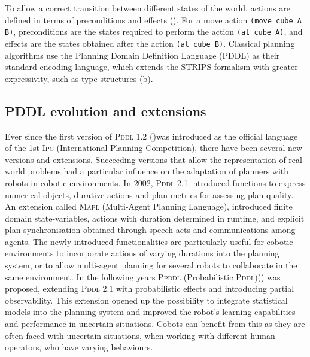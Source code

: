 To allow a correct transition between different states of the world, actions are defined in terms of {preconditions} and {effects} (). For a move action \texttt{(move cube A B)}, preconditions are the states required to perform the action  \texttt{(at cube A)}, and effects are the states obtained after the action \texttt{(at cube B)}. Classical planning algorithms use the Planning Domain Definition Language (PDDL) \cite{ghallab2004automated} as their standard encoding language, which extends the STRIPS \cite{fikes1971strips} formalism with greater expressivity, such as type structures (b). 




\subsection{PDDL evolution and extensions}\label{subsec:PDDL evolution}

Ever since the first version of \textsc{Pddl} 1.2 (\cite{mcdermott1998pddl})was introduced as the official language of the 1st \textsc{Ipc} (International Planning Competition), there have been several new versions and extensions. 
Succeeding versions that allow the representation of real-world problems had a particular influence on the adaptation of planners with robots in cobotic environments. In 2002, \textsc{Pddl} 2.1 introduced functions to express numerical objects, durative actions and plan-metrics for assessing plan quality. 
An extension called \textsc{Mapl} (Multi-Agent Planning Language), introduced finite domain state-variables, actions with duration determined in runtime, and explicit plan synchronisation obtained through speech acts and communications among agents. 
The newly introduced functionalities are particularly useful for cobotic environments to incorporate actions of varying durations into the planning system, or to allow multi-agent planning for several robots to collaborate in the same environment.
In the following years \textsc{Ppddl} (Probabilistic \textsc{Pddl})(\cite{younes:04a}) was proposed, extending \textsc{Pddl} 2.1 with probabilistic effects and introducing partial observability. This extension opened up the possibility to integrate statistical models into the planning system and improved the robot's learning capabilities and performance in uncertain situations. Cobots can benefit from this as they are often faced with uncertain situations, when working with different human operators, who have varying behaviours.

